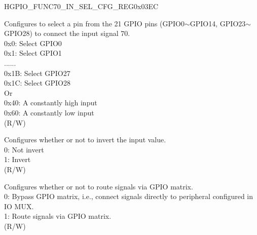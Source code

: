 \begin{register}{H}{GPIO\_FUNC70\_IN\_SEL\_CFG\_REG}{0x03EC}\label{regdesc:GPIOFUNC70INSELCFGREG}
%
%
%
%
\regnewline%
\begin{regdesc}\begin{reglist}
\label{fielddesc:GPIOFUNC70INSEL}\item [GPIO\_FUNC70\_IN\_SEL] Configures to select a pin from the 21 GPIO pins (GPIO0$\sim$GPIO14, GPIO23$\sim$GPIO28) to connect the input signal 70.\\
0x0: Select GPIO0\\
0x1: Select GPIO1\\
......\\
0x1B: Select GPIO27\\
0x1C: Select GPIO28\\
Or\\
0x40: A constantly high input\\
0x60: A constantly low input\\ (R/W)
\label{fielddesc:GPIOFUNC70ININVSEL}\item [GPIO\_FUNC70\_IN\_INV\_SEL] Configures whether or not to invert the input value.\\
0: Not invert\\
1: Invert\\ (R/W)
\label{fielddesc:GPIOSIG70INSEL}\item [GPIO\_SIG70\_IN\_SEL] Configures whether or not to route signals via GPIO matrix.\\
0: Bypass GPIO matrix, i.e., connect signals directly to peripheral configured in IO MUX.\\
1: Route signals via GPIO matrix.\\ (R/W)
\end{reglist}\end{regdesc}
\end{register}


